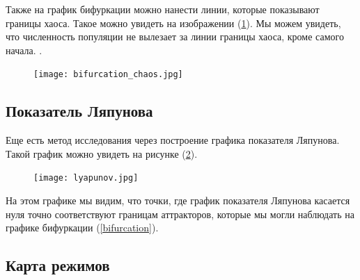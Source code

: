 


        Также на график бифуркации можно нанести линии, которые показывают границы хаоса. Такое можно увидеть на изображении (\ref{bifurcation_chaos}). Мы можем увидеть, что численность популяции не вылезает за линии границы хаоса, кроме самого начала. .

        \begin{figure}
            \centering
            \texttt{[image: bifurcation\_chaos.jpg]}

            \captionsetup{justification=centering}
            \caption{}
            \label{bifurcation_chaos}
        \end{figure}

    \subsection{Показатель Ляпунова}    

        Еще есть метод исследования через построение графика показателя Ляпунова. Такой график можно увидеть на рисунке (\ref{lyapunov}).

        \begin{figure}
            \centering
            \texttt{[image: lyapunov.jpg]}

            \captionsetup{justification=centering}
            \caption{}
            \label{lyapunov}
        \end{figure}

        На этом графике мы видим, что точки, где график показателя Ляпунова касается нуля точно соответствуют границам аттракторов, которые мы могли наблюдать на графике бифуркации (\ref{bifurcation}).

    \subsection{Карта режимов}

